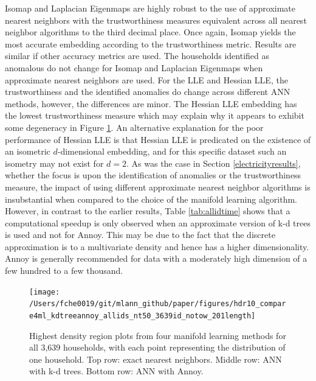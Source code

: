 \documentclass[11pt,a4paper,]{article}
\begin{document}
Isomap and Laplacian Eigenmaps are highly robust to the use of approximate nearest neighbors with the trustworthiness measures equivalent across all nearest neighbor algorithms to the third decimal place. Once again, Isomap yields the most accurate embedding according to the trustworthiness metric. Results are similar if other accuracy metrics are used. The households identified as anomalous do not change for Isomap and Laplacian Eigenmaps when approximate nearest neighbors are used. For the LLE and Hessian LLE, the trustworthiness and the identified anomalies do change across different ANN methods, however, the differences are minor. The Hessian LLE embedding has the lowest trustworthiness measure which may explain why it appears to exhibit some degeneracy in Figure \ref{fig:allidhdr}. An alternative explanation for the poor performance of Hessian LLE is that Hessian LLE is predicated on the existence of an isometric \(d\)-dimensional embedding, and for this specific dataset such an isometry may not exist for \(d=2\). As was the case in Section \ref{electricityresults}, whether the focus is upon the identification of anomalies or the trustworthiness measure, the impact of using different approximate nearest neighbor algorithms is insubstantial when compared to the choice of the manifold learning algorithm. However, in contrast to the earlier results, Table \ref{tab:allidtime} shows that a computational speedup is only observed when an approximate version of k-d trees is used and not for Annoy. This may be due to the fact that the discrete approximation is to a multivariate density and hence has a higher dimensionality. Annoy is generally recommended for data with a moderately high dimension of a few hundred to a few thousand.

\begin{figure}

{\centering \texttt{[image: /Users/fche0019/git/mlann\_github/paper/figures/hdr10\_compare4ml\_kdtreeannoy\_allids\_nt50\_3639id\_notow\_201length]} 

}

\caption{Highest density region plots from four manifold learning methods for all 3,639 households, with each point representing the distribution of one household. Top row: exact nearest neighbors. Middle row: ANN with k-d trees. Bottom row: ANN with Annoy.}\label{fig:allidhdr}
\end{figure}
\end{document}
